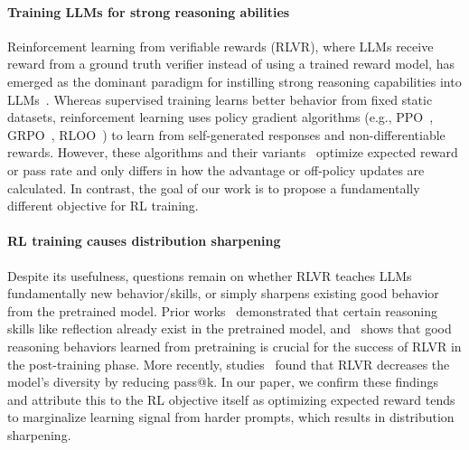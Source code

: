 \documentclass[10pt]{article} %
\begin{document}
\paragraph{Training LLMs for strong reasoning abilities} Reinforcement learning from verifiable rewards (RLVR), where LLMs receive reward from a ground truth verifier instead of using a trained reward model, has emerged as the dominant paradigm for instilling strong reasoning capabilities into LLMs~\citep{jaech2024openai,guo2025deepseek,kimiteam2025kimik15scalingreinforcement,lambert2025tulu3pushingfrontiers,yang2025qwen3technicalreport}. Whereas supervised training learns better behavior from fixed static datasets, reinforcement learning uses policy gradient algorithms (e.g., PPO~\citep{schulman2017proximalpolicyoptimizationalgorithms}, GRPO~\citep{shao2024deepseekmathpushinglimitsmathematical}, RLOO~\citep{ahmadian2024basicsrevisitingreinforcestyle}) to learn from self-generated responses and non-differentiable rewards. However, these algorithms and their variants~\citep{zheng2025groupsequencepolicyoptimization,liu2025understandingr1zeroliketrainingcritical,minimax2025minimaxm1scalingtesttimecompute} optimize expected reward or pass rate and only differs in how the advantage or off-policy updates are calculated. In contrast, the goal of our work is to propose a fundamentally different objective for RL training.


\paragraph{RL training causes distribution sharpening} Despite its usefulness, questions remain on whether RLVR teaches LLMs fundamentally new behavior/skills, or simply sharpens existing good behavior from the pretrained model. Prior works~\citep{liu2025understandingr1zeroliketrainingcritical,zhao2025echochamberrlposttraining,ai2025rethinkingreflectionpretraining} demonstrated that certain reasoning skills like reflection already exist in the pretrained model, and~\citet{gandhi2025cognitivebehaviorsenableselfimproving} shows that good reasoning behaviors learned from pretraining is crucial for the success of RLVR in the post-training phase. More recently, studies~\citep{yue2025doesreinforcementlearningreally,dang2025assessing,wu2026invisibleleashrlvrescape} found that RLVR decreases the model's diversity by reducing pass@k. In our paper, we confirm these findings and attribute this to the RL objective itself as optimizing expected reward tends to marginalize learning signal from harder prompts, which results in distribution sharpening.
\end{document}
